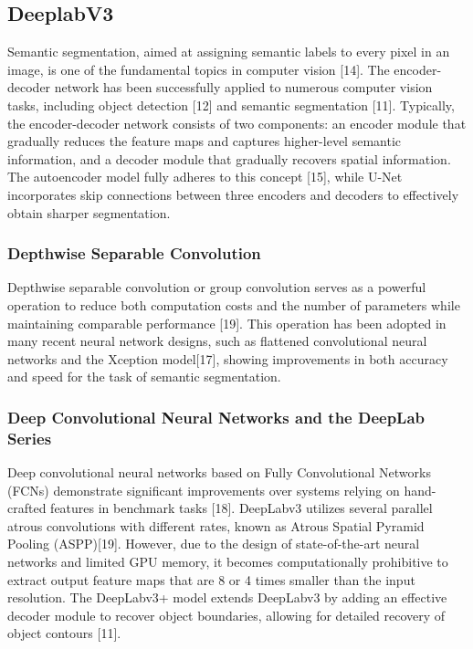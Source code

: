 \documentclass[conference]{IEEEtran}
\begin{document}
\subsection{DeeplabV3}
Semantic segmentation, aimed at assigning semantic labels to every pixel in an image, is one of the fundamental topics in computer vision [14]. The encoder-decoder network has been successfully applied to numerous computer vision tasks, including object detection [12] and semantic segmentation [11]. Typically, the encoder-decoder network consists of two components: an encoder module that gradually reduces the feature maps and captures higher-level semantic information, and a decoder module that gradually recovers spatial information. The autoencoder model fully adheres to this concept [15], while U-Net incorporates skip connections between three encoders and decoders to effectively obtain sharper segmentation.

\subsubsection{Depthwise Separable Convolution}
Depthwise separable convolution or group convolution serves as a powerful operation to reduce both computation costs and the number of parameters while maintaining comparable performance [19]. This operation has been adopted in many recent neural network designs, such as flattened convolutional neural networks and the Xception model[17], showing improvements in both accuracy and speed for the task of semantic segmentation.

\subsubsection{Deep Convolutional Neural Networks and the DeepLab Series}
Deep convolutional neural networks based on Fully Convolutional Networks (FCNs) demonstrate significant improvements over systems relying on hand-crafted features in benchmark tasks [18]. DeepLabv3 utilizes several parallel atrous convolutions with different rates, known as Atrous Spatial Pyramid Pooling (ASPP)[19]. However, due to the design of state-of-the-art neural networks and limited GPU memory, it becomes computationally prohibitive to extract output feature maps that are 8 or 4 times smaller than the input resolution. The DeepLabv3+ model extends DeepLabv3 by adding an effective decoder module to recover object boundaries, allowing for detailed recovery of object contours [11].
\end{document}
